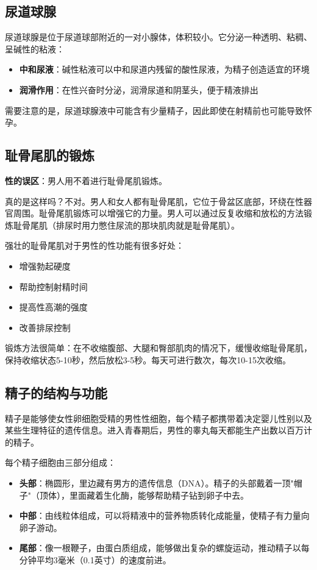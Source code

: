 \subsection{尿道球腺}

尿道球腺是位于尿道球部附近的一对小腺体，体积较小。它分泌一种透明、粘稠、呈碱性的粘液：
\begin{itemize}
    \item \textbf{中和尿液}：碱性粘液可以中和尿道内残留的酸性尿液，为精子创造适宜的环境
    \item \textbf{润滑作用}：在性兴奋时分泌，润滑尿道和阴茎头，便于精液排出
\end{itemize}

需要注意的是，尿道球腺液中可能含有少量精子，因此即使在射精前也可能导致怀孕。

\subsection{耻骨尾肌的锻炼}

\textbf{性的误区}：男人用不着进行耻骨尾肌锻炼。

真的是这样吗？不对。男人和女人都有耻骨尾肌，它位于骨盆区底部，环绕在性器官周围。耻骨尾肌锻炼可以增强它的力量。男人可以通过反复收缩和放松的方法锻炼耻骨尾肌（排尿时用力憋住尿流的那块肌肉就是耻骨尾肌）。

强壮的耻骨尾肌对于男性的性功能有很多好处：
\begin{itemize}
    \item 增强勃起硬度
    \item 帮助控制射精时间
    \item 提高性高潮的强度
    \item 改善排尿控制
\end{itemize}

锻炼方法很简单：在不收缩腹部、大腿和臀部肌肉的情况下，缓慢收缩耻骨尾肌，保持收缩状态5-10秒，然后放松3-5秒。每天可进行数次，每次10-15次收缩。

\subsection{精子的结构与功能}

精子是能够使女性卵细胞受精的男性性细胞，每个精子都携带着决定婴儿性别以及某些生理特征的遗传信息。进入青春期后，男性的睾丸每天都能生产出数以百万计的精子。

每个精子细胞由三部分组成：

\begin{itemize}
    \item \textbf{头部}：椭圆形，里边藏有男方的遗传信息（DNA）。精子的头部戴着一顶"帽子"（顶体），里面藏着生化酶，能够帮助精子钻到卵子中去。
    \item \textbf{中部}：由线粒体组成，可以将精液中的营养物质转化成能量，使精子有力量向卵子游动。
    \item \textbf{尾部}：像一根鞭子，由蛋白质组成，能够做出复杂的螺旋运动，推动精子以每分钟平均3毫米（0.1英寸）的速度前进。
\end{itemize}

